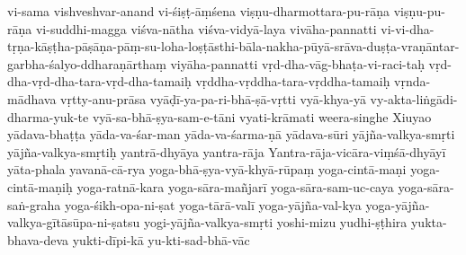 {    vi-sama
vishveshvar-anand
vi-śiṣṭ-āṃśena
viṣṇu-dharmottara-pu-rāṇa
    viṣṇu-pu-rāṇa 
vi-suddhi-magga
viśva-nātha
viśva-vidyā-laya
vivāha-pannatti
vi-vi-dha-tṛṇa-kāṣṭha-pāṣāṇa-pāṃ-su-loha-loṣṭāsthi-bāla-nakha-pūyā-srāva-duṣṭa-vraṇāntar-garbha-śalyo-ddharaṇārthaṃ
viyāha-pannatti
vṛd-dha-vāg-bhaṭa-vi-raci-taḥ
vṛd-dha-vṛd-dha-tara-vṛd-dha-tamaiḥ
vṛddha-vṛddha-tara-vṛddha-tamaiḥ
vṛnda-mādhava
vṛtty-anu-prāsa
vyāḍī-ya-pa-ri-bhā-ṣā-vṛtti
vyā-khya-yā
vy-akta-liṅgādi-dharma-yuk-te
vyā-sa-bhā-ṣya-sam-e-tāni
vyati-krāmati
weera-singhe
Xiuyao
yādava-bhaṭṭa
yāda-va-śar-man
yāda-va-śarma-ṇā
yādava-sūri
yājña-valkya-smṛti
yājña-valkya-smṛtiḥ
yantrā-dhyāya
yantra-rāja
Yantra-rāja-vicāra-viṃśā-dhyāyī
yāta-phala
yavanā-cā-rya
yoga-bhā-ṣya-vyā-khyā-rūpaṃ
yoga-cintā-maṇi
yoga-cintā-maṇiḥ
yoga-ratnā-kara
yoga-sāra-mañjarī
yoga-sāra-sam-uc-caya
yoga-sāra-saṅ-graha
yoga-śikh-opa-ni-ṣat
yoga-tārā-valī
yoga-yājña-val-kya
yoga-yājña-valkya-gītāsūpa-ni-ṣatsu
yogi-yājña-valkya-smṛti
yoshi-mizu
yudhi-ṣṭhira
yukta-bhava-deva
    yukti-dīpi-kā
    yu-kti-sad-bhā-vāc
}
